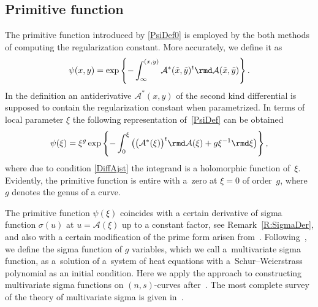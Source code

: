 \subsection{Primitive function}
The primitive function introduced by \eqref{PsiDef0} is employed by the both methods of computing the regularization constant. More accurately, we define it as
\begin{gather}\label{PsiDef}
 \psi(x,y) = \exp\left\{-\int_{\infty}^{(x,y)} \mathcal{A}^\ast(\tilde{x},\tilde{y})^{t} \rmd \mathcal{A}(\tilde{x},\tilde{y}) \right\}.
\end{gather}
In the definition an antiderivative $\mathcal{A}^\ast(x,y)$ of the second kind differential is supposed to contain the regularization constant when parametrized. In terms of local parameter $\xi$ the following representation of~\eqref{PsiDef} can be obtained
\begin{gather*}%
\psi(\xi) = \xi^g \exp \left\{-\int_0^{\xi} \big(\big(\mathcal{A}^\ast(\xi)\big)^t \rmd \mathcal{A}(\xi) + g \xi^{-1}\rmd\xi \big)\right\},
\end{gather*}
where due to condition \eqref{DiffAjst} the integrand is a holomorphic function of~$\xi$. Evidently, the primitive function is entire with a~zero at $\xi=0$ of order~$g$, where~$g$ denotes the genus of a curve.

The primitive function $\psi(\xi)$ coincides with a certain derivative of sigma function $\sigma(u)$ at $u= \mathcal{A}(\xi)$ up to a constant factor, see Remark~\ref{R:SigmaDer}, and also with a certain modification of the prime form arisen from~\cite{N2010}. Following~\cite{BL2004}, we define the sigma function of $g$ variables, which we call a~multivariate sigma function, as a~solution of a~system of heat equations with a~Schur--Weierstrass polynomial as an initial condition. Here we apply the approach to constructing multivariate sigma functions on $(n,s)$-curves after~\cite{BL2004,BL2008}. The most complete survey of the theory of multivariate sigma is given in~\cite{BEL2012}.

